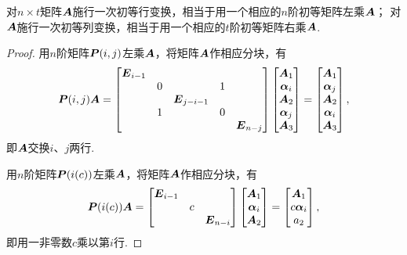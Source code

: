 \begin{property}\label{theorem:逆矩阵.初等矩阵的性质2}
对\(n \times t\)矩阵\(\boldsymbol{A}\)施行一次初等行变换，相当于用一个相应的\(n\)阶初等矩阵左乘\(\boldsymbol{A}\)；
对\(\boldsymbol{A}\)施行一次初等列变换，相当于用一个相应的\(t\)阶初等矩阵右乘\(\boldsymbol{A}\).
\begin{proof}
用\(n\)阶矩阵\(\boldsymbol{P}(i,j)\)左乘\(\boldsymbol{A}\)，将矩阵\(\boldsymbol{A}\)作相应分块，有\[
	\boldsymbol{P}(i,j) \boldsymbol{A} = \begin{bmatrix}
		\boldsymbol{E}_{i-1} \\
		& 0 & & 1 \\
		& & \boldsymbol{E}_{j-i-1} \\
		& 1 & & 0 \\
		& & & & \boldsymbol{E}_{n-j}
	\end{bmatrix}
	\begin{bmatrix}
		\boldsymbol{A}_1 \\ \boldsymbol\alpha_i \\ \boldsymbol{A}_2 \\ \boldsymbol\alpha_j \\ \boldsymbol{A}_3
	\end{bmatrix}
	= \begin{bmatrix}
		\boldsymbol{A}_1 \\ \boldsymbol\alpha_j \\ \boldsymbol{A}_2 \\ \boldsymbol\alpha_i \\ \boldsymbol{A}_3
	\end{bmatrix},
\]
即\(\boldsymbol{A}\)交换\(i\)、\(j\)两行.

用\(n\)阶矩阵\(\boldsymbol{P}(i(c))\)左乘\(\boldsymbol{A}\)，将矩阵\(\boldsymbol{A}\)作相应分块，有\[
	\boldsymbol{P}(i(c)) \boldsymbol{A} = \begin{bmatrix}
		\boldsymbol{E}_{i-1} \\
		& c \\
		& & \boldsymbol{E}_{n-i}
	\end{bmatrix}
	\begin{bmatrix}
		\boldsymbol{A}_1 \\ \boldsymbol\alpha_i \\ \boldsymbol{A}_2
	\end{bmatrix}
	= \begin{bmatrix}
		\boldsymbol{A}_1 \\ c \boldsymbol\alpha_i \\ a_2
	\end{bmatrix},
\]
即用一非零数\(c\)乘以第\(i\)行.


\end{proof}
\end{property}
